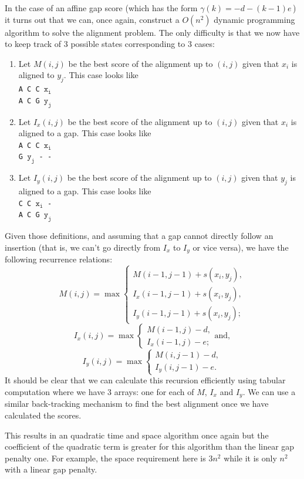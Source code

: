 \documentclass[11pt]{article}
\begin{document}
In the case of an affine gap score (which has the form $\gamma(k) = -d - (k-1)e$\,) it turns out that we can, once again, construct a $O(n^2)$ dynamic programming algorithm to solve the alignment problem.
The only difficulty is that we now have to keep track of 3 possible states corresponding to 3 cases:
\begin{enumerate}
\item Let $M(i,j)$ be the best score of the alignment up to $(i,j)$ given that $x_i$ is aligned to $y_j$. This case looks like\\
{\tt A C C $\mathtt{x_i}$ \\
A C G $\mathtt{y_j}$}
\item Let $I_x(i,j)$ be the best score of the alignment up to $(i,j)$ given that $x_i$ is aligned to a gap. This case looks like\\
{\tt A C C $\mathtt{x_i}$ \\
  G $\mathtt{y_j}$   - -}
\item Let $I_y(i,j)$ be the best score of the alignment up to $(i,j)$ given that $y_j$ is aligned to a gap. This case looks like\\
{\tt  C C $\mathtt{x_i}$  - \\ 
A C G  $\mathtt{y_j}$ }
\end{enumerate}
Given those definitions, and assuming that a gap cannot directly follow an insertion (that is, we can't go directly from $I_x$ to $I_y$ or vice versa), we have the following recurrence relations:
\[ M(i,j)= \max 
\begin{cases}
M(i-1,j-1)+s(x_i,y_j), \\
I_x(i-1,j-1)+s(x_i,y_j), \\
I_y(i-1,j-1)+s(x_i,y_j); 
\end{cases} \]
\[ I_x(i,j)= \max 
\begin{cases}
M(i-1,j)-d, \\
I_x(i-1,j)-e; 
\end{cases} \mbox{and}, \]
\[ I_y(i,j)= \max 
\begin{cases}
M(i,j-1)-d, \\
I_y(i,j-1)-e. 
\end{cases} \]
It should be clear that we can calculate this recursion efficiently using tabular computation where we have 3 arrays: one for each of $M$, $I_x$ and $I_y$.  We can use a similar back-tracking mechanism to find the best alignment once we have calculated the scores.  

This results in an quadratic time and space algorithm once again but the coefficient of the quadratic term is greater for this algorithm than the linear gap penalty one.  For example, the space requirement here is $3n^2$ while it is only $n^2$ with a linear gap penalty.  
\end{document}
